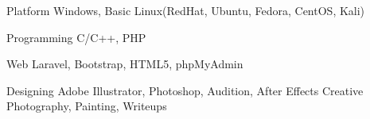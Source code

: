 

\begin{cvskills}

  \cvskill
	{Platform} %
	{Windows, Basic Linux(RedHat, Ubuntu, Fedora, CentOS, Kali)} %

  \cvskill
    {Programming} %
    {C/C++, PHP} %

  \cvskill
    {Web} %
    {Laravel, Bootstrap, HTML5, phpMyAdmin} %

  \cvskill
	{Designing} %
	{Adobe Illustrator, Photoshop, Audition, After Effects} %
  \cvskill
	{Creative} %
	{Photography, Painting, Writeups} %

\end{cvskills}
